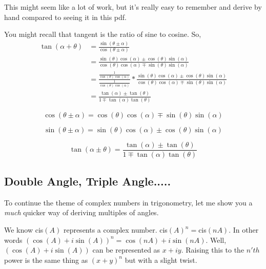 \documentclass[11pt]{scrartcl}
\begin{document}
\vspace{5mm}
\noindent This might seem like a lot of work, but it's really easy to remember and derive by hand compared to seeing it in this pdf.

\vspace{5mm}
\pagebreak
\noindent You might recall that tangent is the ratio of sine to cosine. So,
\begin{align*}
\tan(\alpha + \theta) &= \frac{\sin( \theta \pm \alpha)}{\cos(\theta \pm \alpha)} \\
&= \frac{\sin(\theta) \cos(\alpha) \pm \cos(\theta) \sin(\alpha)}{\cos(\theta) \cos(\alpha) \mp \sin(\theta) \sin(\alpha)} \\
&= \frac{\frac{1}{\cos(\theta)\cos(\alpha)}}{\frac{1}{\cos(\theta)\cos(\alpha)}} * \frac{\sin(\theta) \cos(\alpha) \pm \cos(\theta) \sin(\alpha)}{\cos(\theta) \cos(\alpha) \mp \sin(\theta) \sin(\alpha)} \\
&= \frac{\tan(\alpha)\pm\tan(\theta)}{1\mp\tan(\alpha)\tan(\theta)}
\end{align*}





\vspace{5mm}
\begin{theorem}


\vspace{5mm}
\noindent $$\cos(\theta\pm\alpha) = \cos(\theta)\cos(\alpha)\mp\sin(\theta)\sin(\alpha)$$

\vspace{5mm}
\noindent $$\sin(\theta\pm\alpha) = \sin(\theta)\cos(\alpha)\pm\cos(\theta)\sin(\alpha)$$

\vspace{5mm}
\noindent $$\tan(\alpha\pm\theta) = \frac{\tan(\alpha)\pm\tan(\theta)}{1\mp\tan(\alpha)\tan(\theta)}$$


\end{theorem}


\pagebreak
\subsection{Double Angle, Triple Angle.....}
\noindent To continue the theme of complex numbers in trigonometry, let me show you a \textit{much} quicker way of deriving multiples of angles. 

\vspace{5mm}
\noindent We know cis$(A)$ represents a complex number. cis$(A)^n = $cis$(nA)$. In other words $(\cos(A)+i\sin(A))^n=\cos(nA)+i\sin(nA)$. Well,  $(\cos(A)+i\sin(A))$ can be represented as $x+iy$. Raising this to the $n'th$ power is the same thing as $(x+y)^n$ but with a slight twist. 
\end{document}
